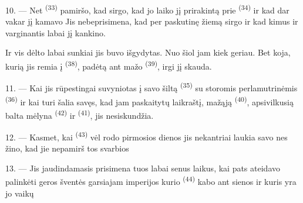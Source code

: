 10. --- Net  \textsuperscript{(33)} pamiršo, kad sirgo, kad jo
 laiko jį prirakintą prie  \textsuperscript{(34)} ir
kad dar vakar jį kamavo  Jis nebeprisimena, kad per
paskutinę žiemą sirgo  ir kad kimus ir varginantis
 labai jį kankino.

Ir vis dėlto labai sunkiai jis buvo išgydytas. Nuo šiol jam kiek geriau. Bet koja,
kurią jis remia į  \textsuperscript{(38)}, padėtą ant mažo
 \textsuperscript{(39)}, irgi jį skauda.

11. --- Kai jis rūpestingai suvyniotas į savo šiltą 
\textsuperscript{(35)} su storomis perlamutrinėmis 
\textsuperscript{(36)} ir kai turi šalia
savęs, kad jam paskaitytų laikraštį, mažąją  \textsuperscript{(40)},
apsivilkusią balta  mėlyna  \textsuperscript{(42)} ir
 \textsuperscript{(41)}, jis nesiskundžia.

12. --- Kasmet, kai  \textsuperscript{(43)} vėl rodo pirmosios
 dienos  jis nekantriai laukia savo 
nes žino, kad jie nepamirš tos svarbios 

13. --- Jis jaudindamasis prisimena tuos labai senus laikus, kai pats ateidavo
palinkėti geros šventės garsiajam imperijos  kurio
 \textsuperscript{(44)} kabo ant sienos ir kuris yra jo vaikų

\VUsaut{6.0mm}
\VUfilet{22mm}
